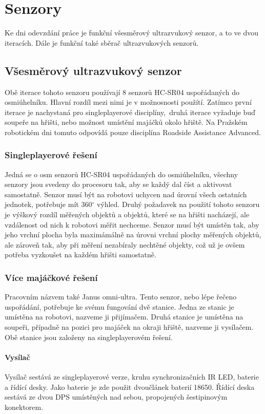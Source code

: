 \chapter{Senzory}
Ke dni odevzdání práce je funkční všesměrový ultrazvukový senzor, a to ve dvou iteracích.
Dále je funkční také sběrač ultrazvukových senzorů.

\section{Všesměrový ultrazvukový senzor}
Obě iterace tohoto senzoru používají 8 senzorů HC-SR04 uspořádaných do osmiúhelníku.
Hlavní rozdíl mezi nimi je v možnosnosti použítí.
Zatímco první iterace je nachystaná pro singleplayerové disciplíny,~druhá iterace vyžaduje buď soupeře na hřišti, nebo možnost umístění majáčků okolo hřiště. 
Na Pražském robotickém dni tomuto odpovídá pouze disciplína Roadside Assistance Advanced.

\subsection{Singleplayerové řešení}
Jedná se o osm senzorů HC-SR04 uspořádaných do osmiúhelníku, všechny senzory jsou svedeny do procesoru tak, aby se každý dal číst a aktivovat samostatně.
Senzor musí být na robotovi uchycen nad úrovní všech ostatních jednotek, potřebuje mít 360$^{\circ}$ výhled.
Druhý požadavek na použití tohoto senzoru je výškový rozdíl měřených objektů a objektů, které se na hřišti nacházejí, ale vzdálenost od nich k robotovi měřit nechceme.
Senzor musí být umístěn tak, aby jeho vrchní plocha byla maximámálně na úrovni vrchní plochy měřených objektů, ale zároveň tak, aby při měření nezabíraly nechtěné objekty, což už je ovšem potřeba vyzkoušet na každém hřišti samostatně.

\subsection{Více majáčkové řešení}
Pracovním názvem také Janus omni-ultra.
Tento senzor, nebo lépe řečeno uspořádání, potřebuje ke svému fungování dvě stanice.
Jedna ze stanic je umístěna na robotovi, nazveme ji přijímačem.
Druhá stanice je umístěna na soupeři, případně na pozici pro majáček na okraji hřiště, nazveme ji vysílačem.
Obě stanice jsou založeny na singleplayerovém řešení.

\subsubsection{Vysílač}
Vysílač sestává ze singleplayerové verze, kruhu synchronizačních IR LED, baterie a řídící desky.
Jako baterie je zde použit dvoučlánek baterií 18650.
Řídící deska sestává ze dvou DPS umístěných nad sebou, propojených šestipinovým konektorem.

